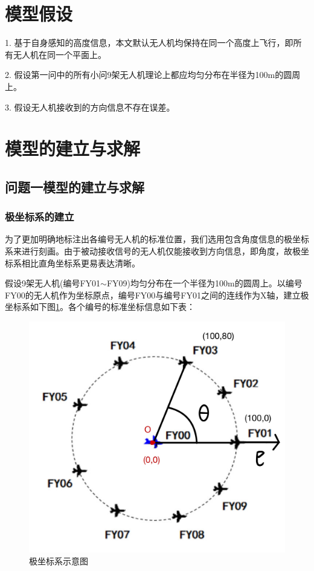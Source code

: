 \documentclass{ctexart}
\begin{document}
\section{模型假设}
1. \quad 基于自身感知的高度信息，本文默认无人机均保持在同一个高度上飞行，即所有无人机在同一个平面上。

2. \quad 假设第一问中的所有小问9架无人机理论上都应均匀分布在半径为100m的圆周上。

3. \quad 假设无人机接收到的方向信息不存在误差。

\section{模型的建立与求解}

\subsection{问题一模型的建立与求解}

\subsubsection{极坐标系的建立}

为了更加明确地标注出各编号无人机的标准位置，我们选用包含角度信息的极坐标系来进行刻画。由于被动接收信号的无人机仅能接收到方向信息，即角度，故极坐标系相比直角坐标系更易表达清晰。

假设9架无人机(编号FY01$\sim$FY09)均匀分布在一个半径为100m的圆周上。以编号FY00的无人机作为坐标原点，编号FY00与编号FY01之间的连线作为X轴，建立极坐标系如下图\ref{极坐标系示意图}。各个编号的标准坐标信息如下表：

\begin{figure}[htbp]
  \centering
  \includegraphics[width=0.40\linewidth]{pic/极坐标.jpg}
  \caption{极坐标系示意图}
  \label{极坐标系示意图}
  \end{figure} 
\end{document}
